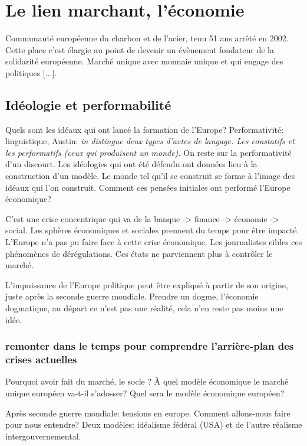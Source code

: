 \chapter{Le lien marchant, l'économie}

Communauté européenne du charbon et de l'acier, tenu 51 ans arrêté en 2002. Cette place c'est élargie au point de devenir un évènement fondateur de la solidarité européenne. Marché unique avec monnaie unique et qui engage des politiques [...].

\section{Idéologie et performabilité}

Quels sont les idéaux qui ont lancé la formation de l'Europe?
Performativité: linguistique, Austin: \emph{in distingue deux types d'actes de langage. Les constatifs et les performatifs (ceux qui produisent un monde).} On reste sur la performativité d'un discourt. Les idéologies qui ont été défendu ont données lieu à la construction d'un modèle. Le monde tel qu'il se construit se forme à l'image des idéaux qui l'on construit. Comment ces pensées initiales ont performé l'Europe économique? 

C'est une crise concentrique qui va de la banque -> finance -> économie -> social. Les sphères économiques et sociales prennent du temps pour être impacté. L'Europe n'a pas pu faire face à cette crise économique. Les journalistes cibles ces phénomènes de dérégulations. Ces états ne parviennent plus à contrôler le marché.

L'impuissance de l'Europe politique peut être expliqué à partir de son origine, juste après la seconde guerre mondiale. Prendre un dogme, l'économie dogmatique, au départ ce n'est pas une réalité, cela n'en reste pas moins une idée.

\subsection{remonter dans le temps pour comprendre l'arrière-plan des crises actuelles}

Pourquoi avoir fait du marché, le socle ? À quel modèle économique le marché unique européen va-t-il s'adosser? Quel sera le modèle économique européen? 

Après seconde guerre mondiale: tensions en europe. Comment allons-nous faire pour nous entendre? Deux modèles: idéalisme fédéral (USA) et de l'autre réalisme intergouvernemental.


